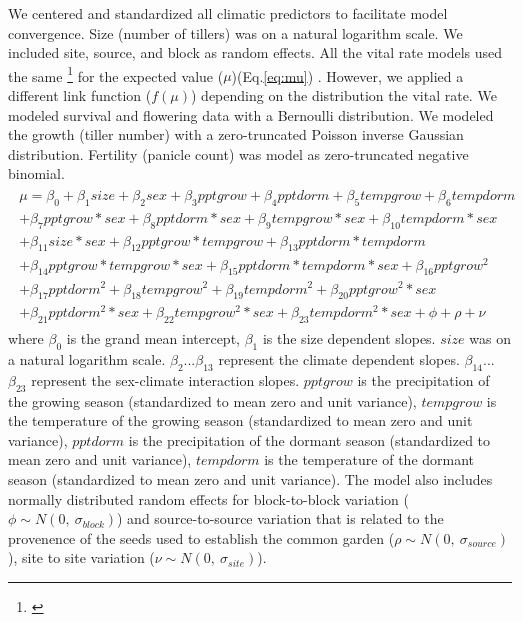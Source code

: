 \documentclass[12pt]{article}
\newcommand{\tom}[2]{{\color{red}{#1}}\footnote{\textit{\color{red}{#2}}}}
\begin{document}
We centered and standardized all climatic predictors to facilitate model convergence.
Size (number of tillers) was on a natural logarithm scale. 
We included site, source, and block as random effects.
All the vital rate models used the same \tom{linear predictor}{It is still a ``linear predictor'' even if it has quadratic terms.} for the expected value ($\mu$)(Eq.\ref{eq:mu}) . 
However, we applied a different link function ($f(\mu)$) depending on the distribution the vital rate. 
We modeled survival and flowering data with a Bernoulli distribution.
We modeled the growth (tiller number) with a zero-truncated Poisson inverse Gaussian distribution. 
Fertility (panicle count) was model as zero-truncated negative binomial. 
\begin{align}\label{eq:mu}
\begin{split}
\mu = \beta_{0} + \beta_{1}size + \beta_{2}sex + \beta_{3}pptgrow + \beta_{4}pptdorm + \beta_{5}tempgrow + \beta_{6}tempdorm \\ 
+ \beta_{7}pptgrow*sex + \beta_{8}pptdorm*sex + \beta_{9}tempgrow*sex + \beta_{10}tempdorm*sex  \\ 
+  \beta_{11}size*sex + \beta_{12}pptgrow*tempgrow + \beta_{13}pptdorm*tempdorm\\
+ \beta_{14}pptgrow*tempgrow*sex + \beta_{15}pptdorm*tempdorm*sex + \beta_{16}pptgrow^2\\
+ \beta_{17}pptdorm^2 + \beta_{18}tempgrow^2 + \beta_{19}tempdorm^2 + \beta_{20}pptgrow^2*sex  \\
+ \beta_{21}pptdorm^2*sex + \beta_{22}tempgrow^2*sex + \beta_{23}tempdorm^2*sex + \phi + \rho + \nu 
\end{split}
\end{align}
\noindent where $\beta_{0}$ is the  grand mean intercept, $\beta_{1}$ is the size dependent slopes.
$size$ was on a natural logarithm scale. 
$\beta_{2}$...$\beta_{13}$ represent the climate dependent slopes.
$\beta_{14}$...$\beta_{23}$ represent the sex-climate interaction slopes.
$pptgrow$ is the precipitation of the growing season (standardized to mean zero and unit variance), $tempgrow$ is the temperature of the growing season (standardized to mean zero and unit variance), $pptdorm$ is the precipitation of the dormant season (standardized to mean zero and unit variance), $tempdorm$ is the temperature of the dormant season (standardized to mean zero and unit variance).
The model also includes normally distributed random effects for block-to-block variation ($\phi \sim N(0,\ \sigma_{block})$) and source-to-source variation that is related to the provenence of the seeds used to establish the common garden ($\rho \sim N(0,\ \sigma_{source})$), site to site variation ($\nu \sim N(0,\ \sigma_{site})$).
\end{document}
